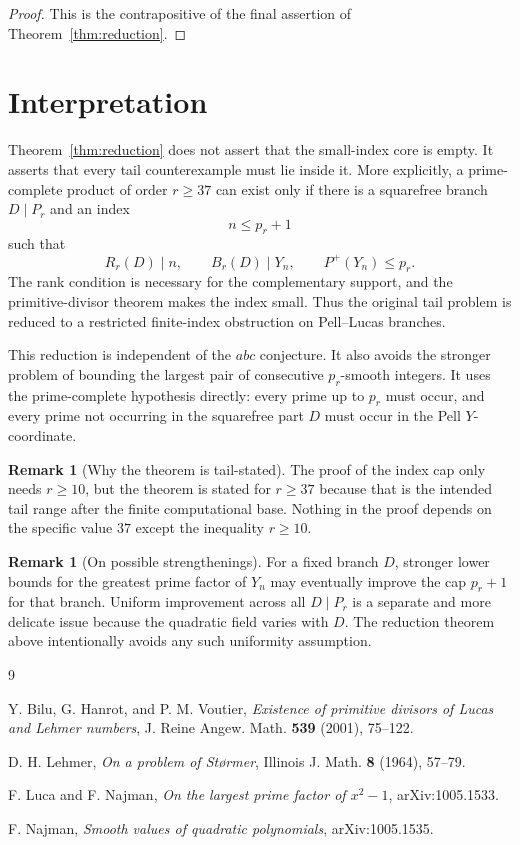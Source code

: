 \documentclass[11pt]{article}
\theoremstyle{definition}
\newtheorem{remark}[theorem]{Remark}
\begin{document}
\begin{proof}
This is the contrapositive of the final assertion of Theorem~\ref{thm:reduction}.
\end{proof}

\section{Interpretation}

Theorem~\ref{thm:reduction} does not assert that the small-index core is empty.  
It asserts that every tail counterexample must lie inside it.  More explicitly, 
a prime-complete product of order $r \ge 37$ can exist only if there is a 
squarefree branch $D\mid P_r$ and an index
\[
        n\le p_r+1
\]
such that
\[
        R_r(D)\mid n,
        \qquad
        B_r(D)\mid Y_n,
        \qquad
        P^+(Y_n)\le p_r.
\]
The rank condition is necessary for the complementary support, and the primitive-divisor 
theorem makes the index small.  Thus the original tail problem is reduced to a restricted 
finite-index obstruction on Pell--Lucas branches.

This reduction is independent of the $abc$ conjecture.  It also avoids the stronger 
problem of bounding the largest pair of consecutive $p_r$-smooth integers.  It uses the 
prime-complete hypothesis directly: every prime up to $p_r$ must occur, and every prime 
not occurring in the squarefree part $D$ must occur in the Pell $Y$-coordinate.

\begin{remark}[Why the theorem is tail-stated]
The proof of the index cap only needs $r \ge 10$, but the theorem is stated for $r \ge 37$ 
because that is the intended tail range after the finite computational base.  
Nothing in the proof depends on the specific value $37$ except the inequality $r \ge 10$.
\end{remark}

\begin{remark}[On possible strengthenings]
For a fixed branch $D$, stronger lower bounds for the greatest prime factor of $Y_n$ may 
eventually improve the cap $p_r+1$ for that branch.  Uniform improvement across all 
$D\mid P_r$ is a separate and more delicate issue because the quadratic field varies 
with $D$.  The reduction theorem above intentionally avoids any such uniformity assumption.
\end{remark}

\begin{thebibliography}{9}

Y. Bilu, G. Hanrot, and P. M. Voutier,
\emph{Existence of primitive divisors of Lucas and Lehmer numbers},
J. Reine Angew. Math. \textbf{539} (2001), 75--122.

D. H. Lehmer,
\emph{On a problem of St\o rmer},
Illinois J. Math. \textbf{8} (1964), 57--79.

F. Luca and F. Najman,
\emph{On the largest prime factor of $x^2-1$},
arXiv:1005.1533.

F. Najman,
\emph{Smooth values of quadratic polynomials},
arXiv:1005.1535.

\end{thebibliography}
\end{document}
